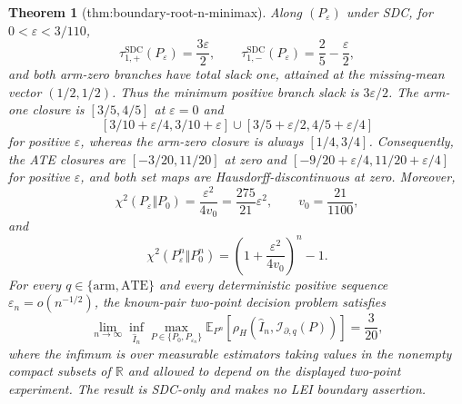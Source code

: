 \documentclass{article}
\newtheorem{theorem}{Theorem}
\begin{document}
\begin{theorem}[thm:boundary-root-n-minimax]\label{thm:boundary-root-n-minimax}
Along \((P_\varepsilon)\) under SDC, for \(0<\varepsilon<3/110\),
\[
 \tau_{1,+}^{\mathrm{SDC}}(P_\varepsilon)=\frac{3\varepsilon}{2},\qquad
 \tau_{1,-}^{\mathrm{SDC}}(P_\varepsilon)=\frac25-\frac{\varepsilon}{2},
\]
and both arm-zero branches have total slack one, attained at the missing-mean vector \((1/2,1/2)\).  Thus the minimum positive branch slack is \(3\varepsilon/2\).  The arm-one closure is \([3/5,4/5]\) at \(\varepsilon=0\) and
\[
 [3/10+\varepsilon/4,3/10+\varepsilon]
 \mathbin{\cup}[3/5+\varepsilon/2,4/5+\varepsilon/4]
\]
for positive \(\varepsilon\), whereas the arm-zero closure is always \([1/4,3/4]\).  Consequently, the ATE closures are \([-3/20,11/20]\) at zero and \([-9/20+\varepsilon/4,11/20+\varepsilon/4]\) for positive \(\varepsilon\), and both set maps are Hausdorff-discontinuous at zero.  Moreover,
\[
 \chi^2(P_\varepsilon\Vert P_0)=\frac{\varepsilon^2}{4v_0}
 =\frac{275}{21}\varepsilon^2,
 \qquad v_0=\frac{21}{1100},
\]
and
\[
 \chi^2(P_\varepsilon^n\Vert P_0^n)
 =\left(1+\frac{\varepsilon^2}{4v_0}\right)^n-1.
\]
For every \(q\in\{\mathrm{arm},\mathrm{ATE}\}\) and every deterministic positive sequence \(\varepsilon_n=o(n^{-1/2})\), the known-pair two-point decision problem satisfies
\[
 \lim_{n\to\infty}\inf_{\widehat I_n}
 \max_{P\in\{P_0,P_{\varepsilon_n}\}}
 \mathbb E_{P^n}\!\left[
 \rho_H\!\left(\widehat I_n,\mathcal I_{\partial,q}(P)\right)\right]
 =\frac{3}{20},
\]
where the infimum is over measurable estimators taking values in the nonempty compact subsets of \(\mathbb R\) and allowed to depend on the displayed two-point experiment.  The result is SDC-only and makes no LEI boundary assertion.
\end{theorem}
\end{document}
